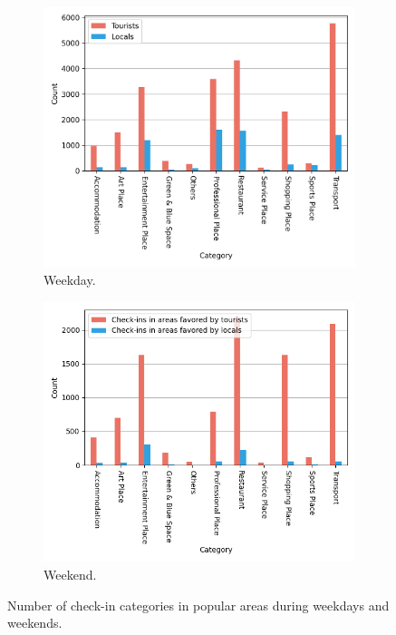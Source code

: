 \documentclass{article}
\theoremstyle{definition}
\theoremstyle{remark}
\begin{document}
\begin{figure}[!h]

\begin{subfigure}{0.5\textwidth}
\includegraphics[width=1\linewidth]{figures/diff_pop_category_weekday.png} 
\caption{Weekday.}
\label{fig:diff_pop_category_weekday}
\end{subfigure}
\begin{subfigure}{0.5\textwidth}
\includegraphics[width=1\linewidth]{figures/diff_pop_category_weekend.png}
\caption{Weekend.}
\label{fig:diff_pop_category_weekend}
\end{subfigure}

\caption{Number of check-in categories in popular areas during weekdays and weekends.} \label{fig:hotspots_category_week}
\end{figure}
\end{document}
